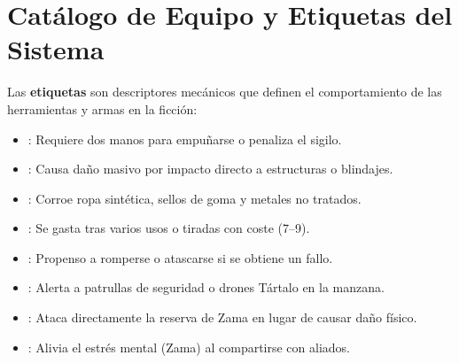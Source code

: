 \section{Catálogo de Equipo y Etiquetas del Sistema}

Las \textbf{etiquetas} son descriptores mecánicos que definen el comportamiento de las herramientas y armas en la ficción:

\begin{itemize}
  \item {}: Requiere dos manos para empuñarse o penaliza el sigilo.
  \item {}: Causa daño masivo por impacto directo a estructuras o blindajes.
  \item {}: Corroe ropa sintética, sellos de goma y metales no tratados.
  \item {}: Se gasta tras varios usos o tiradas con coste (7--9).
  \item {}: Propenso a romperse o atascarse si se obtiene un fallo.
  \item {}: Alerta a patrullas de seguridad o drones Tártalo en la manzana.
  \item {}: Ataca directamente la reserva de Zama en lugar de causar daño físico.
  \item {}: Alivia el estrés mental (Zama) al compartirse con aliados.
\end{itemize}

